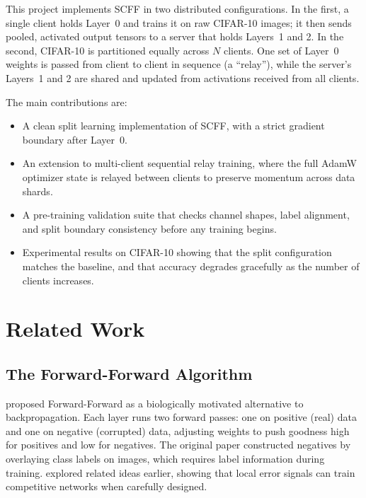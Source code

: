 \documentclass[12pt]{article}
\begin{document}
This project implements SCFF in two distributed configurations. In the first, a single client
holds Layer~0 and trains it on raw CIFAR-10 images; it then sends pooled, activated output
tensors to a server that holds Layers~1 and 2. In the second, CIFAR-10 is partitioned equally
across $N$ clients. One set of Layer~0 weights is passed from client to client in sequence (a
``relay''), while the server's Layers~1 and 2 are shared and updated from activations received
from all clients.

The main contributions are:
\begin{itemize}
  \item A clean split learning implementation of SCFF, with a strict gradient boundary after
        Layer~0.
  \item An extension to multi-client sequential relay training, where the full AdamW optimizer
        state is relayed between clients to preserve momentum across data shards.
  \item A pre-training validation suite that checks channel shapes, label alignment, and split
        boundary consistency before any training begins.
  \item Experimental results on CIFAR-10 showing that the split configuration matches the
        baseline, and that accuracy degrades gracefully as the number of clients increases.
\end{itemize}

\section{Related Work}
\label{sec:related}

\subsection{The Forward-Forward Algorithm}

\citet{hinton2022forward} proposed Forward-Forward as a biologically motivated alternative to
backpropagation. Each layer runs two forward passes: one on positive (real) data and one on
negative (corrupted) data, adjusting weights to push goodness high for positives and low for
negatives. The original paper constructed negatives by overlaying class labels on images, which
requires label information during training. \citet{nokland2019local} explored related ideas
earlier, showing that local error signals can train competitive networks when carefully designed.
\end{document}
